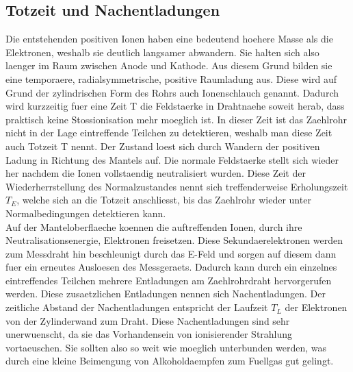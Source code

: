 \documentclass[titlepage=firstcover, captions=tableheading]{scrartcl}
\begin{document}
\subsection{Totzeit und Nachentladungen}
Die entstehenden positiven Ionen haben eine bedeutend hoehere Masse als die Elektronen, weshalb sie deutlich langsamer abwandern. Sie halten sich also laenger im Raum zwischen Anode und Kathode. Aus diesem Grund bilden sie eine temporaere, radialsymmetrische, positive Raumladung aus. Diese wird auf Grund der zylindrischen Form des Rohrs auch Ionenschlauch genannt. Dadurch wird kurzzeitig fuer eine Zeit T die Feldstaerke in Drahtnaehe soweit herab, dass praktisch keine Stossionisation mehr moeglich ist. In dieser Zeit ist das Zaehlrohr nicht in der Lage eintreffende Teilchen zu detektieren, weshalb man diese Zeit auch Totzeit T nennt. Der Zustand loest sich durch Wandern der positiven Ladung in Richtung des Mantels auf. Die normale Feldstaerke stellt sich wieder her nachdem die Ionen vollstaendig neutralisiert wurden. Diese Zeit der Wiederherrstellung des Normalzustandes nennt sich treffenderweise Erholungszeit $T_E$, welche sich an die Totzeit anschliesst, bis das Zaehlrohr wieder unter Normalbedingungen detektieren kann.\\
Auf der Manteloberflaeche koennen die auftreffenden Ionen, durch ihre Neutralisationsenergie, Elektronen freisetzen. Diese Sekundaerelektronen werden zum Messdraht hin beschleunigt durch das E-Feld und sorgen auf diesem dann fuer ein erneutes Ausloesen des Messgeraets. Dadurch kann durch ein einzelnes eintreffendes Teilchen mehrere Entladungen am  Zaehlrohrdraht hervorgerufen werden. Diese zusaetzlichen Entladungen nennen sich Nachentladungen. Der zeitliche Abstand der Nachentladungen entspricht der Laufzeit $T_L$ der Elektronen von der Zylinderwand zum Draht. Diese Nachentladungen sind sehr unerwuenscht, da sie das Vorhandensein von ionisierender Strahlung vortaeuschen. Sie sollten also so weit wie moeglich unterbunden werden, was durch eine kleine Beimengung von Alkoholdaempfen zum Fuellgas gut gelingt.
\end{document}
